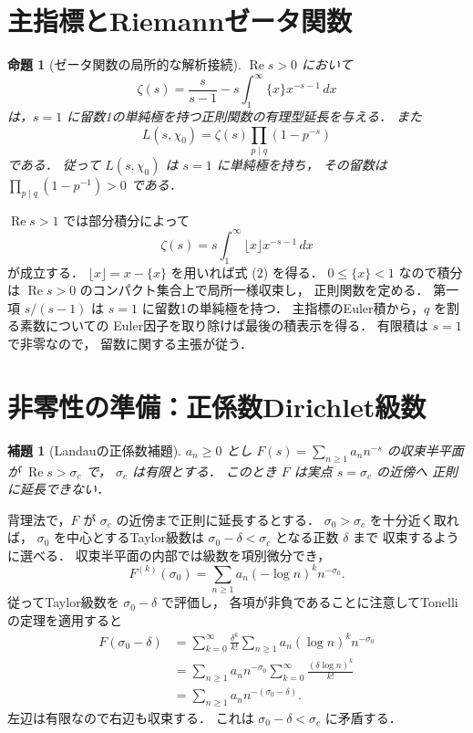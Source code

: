 \documentclass[a5paper,10pt,onecolumn]{jsarticle}
\makeatletter
\theoremstyle{mathnotetheorem}
\newtheorem{lemma}[theorem]{補題}
\newtheorem{proposition}[theorem]{命題}
\renewcommand{\proofname}{証明}
\renewenvironment{proof}[1][\proofname]{%
  \par\pushQED{\qed}\normalfont\topsep4\p@\@plus2\p@\relax
  \trivlist\item[\hskip\labelsep\bfseries #1]\ignorespaces
}{\popQED\endtrivlist\@endpefalse}
\makeatother
\begin{document}
\section{主指標とRiemannゼータ関数}

\begin{proposition}[ゼータ関数の局所的な解析接続]
\label{prop:zeta}
$\operatorname{Re}s>0$ において
\[
 \zeta(s)=\frac{s}{s-1}
 -s\int_1^\infty\{x\}x^{-s-1}\,dx
 \tag{2}
\]
は，$s=1$ に留数1の単純極を持つ正則関数の有理型延長を与える．
また
\[
 L(s,\chi_0)=\zeta(s)\prod_{p\mid q}(1-p^{-s})
\]
である．
従って $L(s,\chi_0)$ は $s=1$ に単純極を持ち，
その留数は $\prod_{p\mid q}(1-p^{-1})>0$ である．
\end{proposition}
\begin{proof}
$\operatorname{Re}s>1$ では部分積分によって
\[
 \zeta(s)=s\int_1^\infty\lfloor x\rfloor x^{-s-1}\,dx
\]
が成立する．
$\lfloor x\rfloor=x-\{x\}$ を用いれば式 (2) を得る．
$0\le\{x\}<1$ なので積分は
$\operatorname{Re}s>0$ のコンパクト集合上で局所一様収束し，
正則関数を定める．
第一項 $s/(s-1)$ は $s=1$ に留数1の単純極を持つ．
主指標のEuler積から，$q$ を割る素数についての
Euler因子を取り除けば最後の積表示を得る．
有限積は $s=1$ で非零なので，
留数に関する主張が従う．
\end{proof}

\section{非零性の準備：正係数Dirichlet級数}

\begin{lemma}[Landauの正係数補題]\label{lem:landau}
$a_n\ge0$ とし
$F(s)=\sum_{n\ge1}a_n n^{-s}$ の収束半平面が
$\operatorname{Re}s>\sigma_c$ で，
$\sigma_c$ は有限とする．
このとき $F$ は実点 $s=\sigma_c$ の近傍へ
正則に延長できない．
\end{lemma}
\begin{proof}
背理法で，$F$ が $\sigma_c$ の近傍まで正則に延長するとする．
$\sigma_0>\sigma_c$ を十分近く取れば，
$\sigma_0$ を中心とするTaylor級数は
$\sigma_0-\delta<\sigma_c$ となる正数 $\delta$ まで
収束するように選べる．
収束半平面の内部では級数を項別微分でき，
\[
 F^{(k)}(\sigma_0)
 =\sum_{n\ge1}a_n(-\log n)^k n^{-\sigma_0}.
\]
従ってTaylor級数を $\sigma_0-\delta$ で評価し，
各項が非負であることに注意してTonelliの定理を適用すると
\[
 \begin{aligned}
 F(\sigma_0-\delta)
 &=\sum_{k=0}^\infty\frac{\delta^k}{k!}
    \sum_{n\ge1}a_n(\log n)^k n^{-\sigma_0}\\
 &=\sum_{n\ge1}a_n n^{-\sigma_0}
    \sum_{k=0}^\infty\frac{(\delta\log n)^k}{k!}\\
 &=\sum_{n\ge1}a_n n^{-(\sigma_0-\delta)}.
 \end{aligned}
\]
左辺は有限なので右辺も収束する．
これは $\sigma_0-\delta<\sigma_c$ に矛盾する．
\end{proof}
\end{document}
